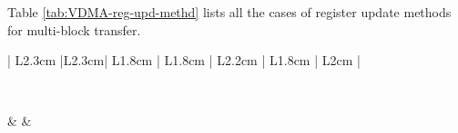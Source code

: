 \documentclass[main\_\_EN.tex]{subfiles}
\begin{document}
Table \ref{tab:VDMA-reg-upd-methd} lists all the cases of register update methods for multi-block transfer.
\clearpage
\begin{small}
\begin{longtable}{ | L{2.3cm} |L{2.3cm}| L{1.8cm} | L{1.8cm} | L{2.2cm} | L{1.8cm} | L{2cm} | }

\caption{Register Update Methods for Multi-Block Transfer}

\label{tab:VDMA-reg-upd-methd} \\
\hline
{}

 &  & \\ 


\end{longtable}
\end{small}
\end{document}
